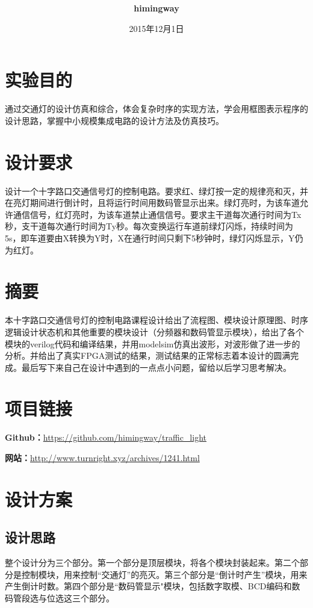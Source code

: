 \documentclass[12pt,a4paper]{article}
\title{\textbf{\CJKfamily{hei}{\huge 集成电路设计实验报告}}}
\author{\textbf{himingway}}
\date{2015年12月1日}
\begin{document}
	\maketitle
	\tableofcontents
	\newpage
	\section{实验目的}
	通过交通灯的设计仿真和综合，体会复杂时序的实现方法，学会用框图表示程序的设计思路，掌握中小规模集成电路的设计方法及仿真技巧。
	\section{设计要求}
	
	设计一个十字路口交通信号灯的控制电路。要求红、绿灯按一定的规律亮和灭，并在亮灯期间进行倒计时，且将运行时间用数码管显示出来。绿灯亮时，为该车道允许通信信号，红灯亮时，为该车道禁止通信信号。要求主干道每次通行时间为Tx秒，支干道每次通行时间为Ty秒。每次变换运行车道前绿灯闪烁，持续时间为5s，即车道要由X转换为Y时，X在通行时间只剩下5秒钟时，绿灯闪烁显示，Y仍为红灯。
	\section{摘要}
	本十字路口交通信号灯的控制电路课程设计给出了流程图、模块设计原理图、时序逻辑设计状态机和其他重要的模块设计（分频器和数码管显示模块），给出了各个模块的verilog代码和编译结果，并用modelsim仿真出波形，对波形做了进一步的分析。并给出了真实FPGA测试的结果，测试结果的正常标志着本设计的圆满完成。最后写下来自己在设计中遇到的一点点小问题，留给以后学习思考解决。	
	\section{项目链接}
		\textbf{Github：}\url{https://github.com/himingway/traffic_light}
		
		\textbf{网站：}\url{http://www.turnright.xyz/archives/1241.html}
		
	\section{设计方案}
		\subsection{设计思路}
		整个设计分为三个部分。第一个部分是顶层模块，将各个模块封装起来。第二个部分是控制模块，用来控制“交通灯”的亮灭。第三个部分是“倒计时产生”模块，用来产生倒计时数。第四个部分是“数码管显示"模块，包括数字取模、BCD编码和数码管段选与位选这三个部分。
		
\end{document}

